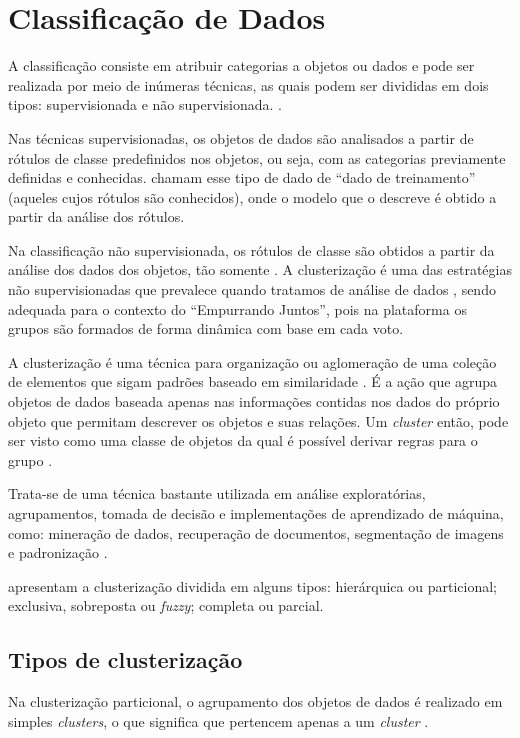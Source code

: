 \chapter{Classificação de Dados} \label{apd:classificacao}

A classificação consiste em atribuir categorias a objetos ou dados e pode ser realizada por meio de inúmeras técnicas, as quais podem
ser divididas em dois tipos: supervisionada e não supervisionada. \cite{tan2013data, han2011data, clustering_review}.

Nas técnicas supervisionadas, os objetos de dados são analisados a partir de rótulos de classe predefinidos nos objetos, ou seja, 
com as categorias previamente definidas e conhecidas.  chamam esse tipo de dado de ``dado de treinamento''
(aqueles cujos rótulos são conhecidos), onde o modelo que o descreve é obtido a partir da análise dos rótulos.

Na classificação não supervisionada, os rótulos de classe são obtidos a partir da análise dos dados dos objetos, tão somente \cite{tan2013data}.
A clusterização é uma das estratégias não supervisionadas que prevalece quando tratamos de análise de dados \cite{singh2017proportional}, sendo adequada para o contexto
do ``Empurrando Juntos'', pois na plataforma os grupos são formados de forma dinâmica com base em cada voto.

A clusterização é uma técnica para organização ou aglomeração
de uma coleção de elementos que sigam padrões baseado em similaridade \cite{clustering_review}.
É a ação que agrupa objetos de dados
baseada apenas nas informações contidas nos dados do próprio objeto que permitam descrever os objetos e suas relações. Um \textit{cluster}
então, pode ser visto como uma classe de objetos da qual é possível derivar regras para o grupo \cite{tan2013data, han2011data}.

Trata-se de uma técnica bastante utilizada em análise exploratórias, agrupamentos, 
tomada de decisão e implementações de aprendizado de máquina, como:
mineração de dados, recuperação de documentos, segmentação de imagens e padronização \cite{clustering_review}.

 apresentam a clusterização dividida em alguns tipos: 
hierárquica ou particional; exclusiva, sobreposta ou \textit{fuzzy}; completa ou parcial.

\section{Tipos de clusterização}
Na clusterização particional, o agrupamento dos 
objetos de dados é realizado em simples \textit{clusters}, o que significa que pertencem apenas a um \textit{cluster} \cite{tan2013data}.

